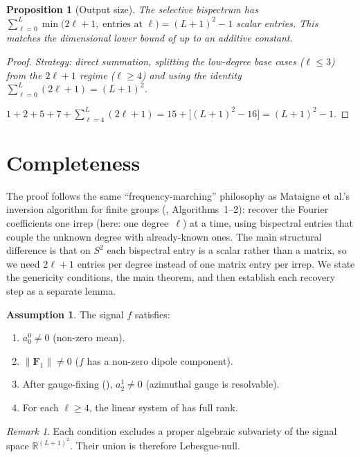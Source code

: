 \documentclass{article}
\theoremstyle{plain}
\newtheorem{proposition}[theorem]{Proposition}
\theoremstyle{definition}
\newtheorem{assumption}[theorem]{Assumption}
\theoremstyle{remark}
\newtheorem{remark}[theorem]{Remark}
\newcommand{\norm}[1]{\lVert #1 \rVert}
\newcommand{\R}{\mathbb{R}}
\begin{document}
\begin{proposition}[Output size]\label{prop:output-size}
The selective bispectrum has
$\displaystyle
  \sum_{\ell=0}^{L} \min\bigl(2\ell+1,\;
    \text{entries at } \ell\bigr)
  = (L+1)^2 - 1
$
scalar entries. This matches the dimensional lower bound of
 up to an additive constant.
\end{proposition}
\begin{proof}
\emph{Strategy: direct summation, splitting the low-degree base cases
($\ell \le 3$) from the $2\ell+1$ regime ($\ell \ge 4$) and using
the identity $\sum_{\ell=0}^{L}(2\ell+1) = (L+1)^2$.}

$1 + 2 + 5 + 7 + \sum_{\ell=4}^{L}(2\ell+1)
= 15 + \bigl[(L+1)^2 - 16\bigr] = (L+1)^2 - 1$.
\end{proof}


\section{Completeness}\label{sec:completeness}

The proof follows the same ``frequency-marching'' philosophy as
Mataigne et al.'s inversion algorithm for finite groups
(\cite{mataigne2024}, Algorithms~1--2): recover the Fourier
coefficients one irrep (here: one degree~$\ell$) at a time, using
bispectral entries that couple the unknown degree with already-known
ones.  The main structural difference is that on $S^2$ each bispectral
entry is a scalar rather than a matrix, so we need $2\ell+1$ entries
per degree instead of one matrix entry per irrep.  We state the
genericity conditions, the main theorem, and then establish each
recovery step as a separate lemma.

\begin{assumption}\label{ass:generic}
The signal $f$ satisfies:
\begin{enumerate}[label=(G\arabic*),nosep]
  \item $a_0^0 \ne 0$ (non-zero mean).
  \item $\norm{\mathbf{F}_1} \ne 0$ ($f$ has a non-zero dipole component).
  \item After gauge-fixing (), $a_2^1 \ne 0$ (azimuthal
    gauge is resolvable).
  \item For each $\ell \ge 4$, the linear system of
     has full rank.
\end{enumerate}
\end{assumption}

\begin{remark}
Each condition excludes a proper algebraic subvariety of the signal
space $\R^{(L+1)^2}$. Their union is therefore Lebesgue-null.
\end{remark}
\end{document}
